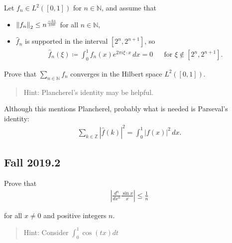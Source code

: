 \begin{problem}[?]

Let \(f_n \in L^2([0, 1])\) for \(n\in {\mathbb{N}}\), and assume that

\begin{itemize}
\item
  \({\left\lVert {f_n} \right\rVert}_2 \leq n^{-51 \over 100}\) for all
  \(n\in {\mathbb{N}}\),
\item
  \(\widehat{f}_n\) is supported in the interval \([2^n, 2^{n+1}]\), so
  \begin{align*}
  \widehat{f}_n(\xi) \coloneqq\int_0^1 f_n(x) e^{2\pi i \xi \cdot x} \,dx= 0 && \text{for } \xi \not\in [2^n, 2^{n+1}]
  .\end{align*}
\end{itemize}

Prove that \(\sum_{n\in {\mathbb{N}}} f_n\) converges in the Hilbert
space \(L^2([0, 1])\).

\begin{quote}
Hint: Plancherel's identity may be helpful.
\end{quote}

\end{problem}

\begin{warnings}

Although this mentions Plancherel, probably what is needed is Parseval's
identity:
\begin{align*}
\sum_{k\in {\mathbb{Z}}} {\left\lvert {\widehat{f}(k)} \right\rvert}^2 = \int_0^1 {\left\lvert {f(x)} \right\rvert}^2\,dx
.\end{align*}

\end{warnings}

\hypertarget{fall-2019.2}{%
\subsection{Fall 2019.2}\label{fall-2019.2}}

Prove that
\begin{align*}
\left| \frac{d^{n}}{d x^{n}} \frac{\sin x}{x}\right| \leq \frac{1}{n}
\end{align*}

for all \(x \neq 0\) and positive integers \(n\).

\begin{quote}
Hint: Consider \(\displaystyle\int_0^1 \cos(tx) dt\)
\end{quote}

